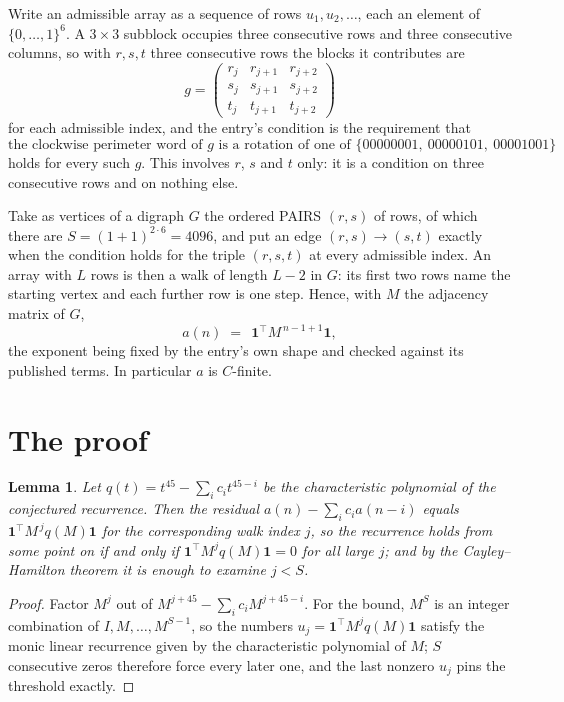 \documentclass[11pt,a4paper]{article}
\theoremstyle{plain}
\newtheorem{lemma}[theorem]{Lemma}
\theoremstyle{definition}
\begin{document}
Write an admissible array as a sequence of rows $u_1,u_2,\dots$, each an element of
$\{0,\dots,1\}^{6}$. A $3\times3$ subblock occupies three consecutive rows and
three consecutive columns, so with $r,s,t$ three consecutive rows the blocks it
contributes are
\[
g=\begin{pmatrix}r_j&r_{j+1}&r_{j+2}\\ s_j&s_{j+1}&s_{j+2}\\ t_j&t_{j+1}&t_{j+2}\end{pmatrix}
\]
for each admissible index, and the entry's condition is the requirement that
\[
\text{the clockwise perimeter word of }g\text{ is a rotation of one of }\{00000001,\ 00000101,\ 00001001\}
\]
holds for every such $g$. This involves $r$, $s$ and $t$ only: it is a condition on
three consecutive rows and on nothing else.

Take as vertices of a digraph $G$ the ordered PAIRS $(r,s)$ of rows, of which there are
$S=(1+1)^{2\cdot6}=4096$, and put an edge $(r,s)\to(s,t)$ exactly when the condition
holds for the triple $(r,s,t)$ at every admissible index. An array with $L$ rows is then a
walk of length $L-2$ in $G$: its first two rows name the starting vertex and each further
row is one step. Hence, with $M$ the adjacency matrix of $G$,
\[
a(n)\;=\;\,\mathbf{1}^{\!\top}M^{\,n-1+1}\mathbf{1},
\]
the exponent being fixed by the entry's own shape and checked against its published terms.
In particular $a$ is $C$-finite.

\section{The proof}

\begin{lemma}\label{lem:crit}
Let $q(t)=t^{45}-\sum_i c_it^{45-i}$ be the characteristic polynomial of the
conjectured recurrence. Then the residual $a(n)-\sum_ic_ia(n-i)$ equals
$\mathbf{1}^{\!\top}M^{\,j}q(M)\mathbf{1}$ for the corresponding walk index
$j$, so the recurrence holds from some point on if and only if
$\mathbf{1}^{\!\top}M^{j}q(M)\mathbf{1}=0$ for all large $j$; and by the
Cayley--Hamilton theorem it is enough to examine $j<S$.
\end{lemma}

\begin{proof}
Factor $M^{j}$ out of $M^{j+45}-\sum_ic_iM^{j+45-i}$. For the bound, $M^{S}$
is an integer combination of $I,M,\dots,M^{S-1}$, so the numbers
$u_j=\mathbf{1}^{\!\top}M^{j}q(M)\mathbf{1}$ satisfy the monic linear recurrence given by
the characteristic polynomial of $M$; $S$ consecutive zeros therefore force every later one,
and the last nonzero $u_j$ pins the threshold exactly.
\end{proof}
\end{document}
